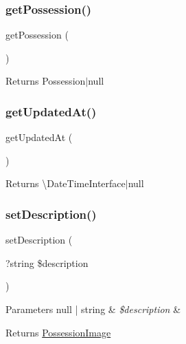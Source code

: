 \subsubsection{\texorpdfstring{getPossession()}{getPossession()}}
{\footnotesize\ttfamily get\+Possession (\begin{DoxyParamCaption}{ }\end{DoxyParamCaption})}

\begin{DoxyReturn}{Returns}
Possession$\vert$null 
\end{DoxyReturn}
\mbox{\label{class_app_1_1_entity_1_1_possession_image_a789bc1a92b41cf8c0958231bc1f27131}} 
\subsubsection{\texorpdfstring{getUpdatedAt()}{getUpdatedAt()}}
{\footnotesize\ttfamily get\+Updated\+At (\begin{DoxyParamCaption}{ }\end{DoxyParamCaption})}

\begin{DoxyReturn}{Returns}
\textbackslash{}\+Date\+Time\+Interface$\vert$null 
\end{DoxyReturn}
\mbox{\label{class_app_1_1_entity_1_1_possession_image_acee77db44e361e2773e2734033f2a1c5}} 
\subsubsection{\texorpdfstring{setDescription()}{setDescription()}}
{\footnotesize\ttfamily set\+Description (\begin{DoxyParamCaption}\item[{?string}]{\$description }\end{DoxyParamCaption})}


\begin{DoxyParams}[1]{Parameters}
null | string & {\em \$description} & \\
\hline
\end{DoxyParams}
\begin{DoxyReturn}{Returns}
\mbox{\hyperlink{class_app_1_1_entity_1_1_possession_image}{Possession\+Image}} 
\end{DoxyReturn}
\mbox{\label{class_app_1_1_entity_1_1_possession_image_afe1e5b6950ecff63ff841b5f6b0b819c}} 
